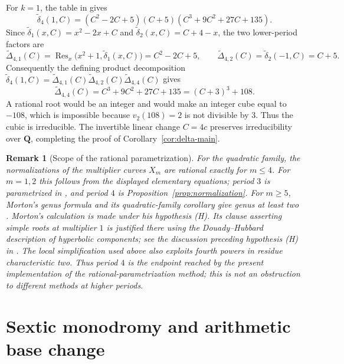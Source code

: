 \documentclass[11pt]{article}
\newtheorem{remark}[theorem]{Remark}
\newcommand{\Q}{\mathbf Q}
\begin{document}
For $k=1$, the table in
\cite[Section 3, Table 1]{MortonVivaldi1995} gives
\[
 \widetilde\delta_4(1,C)
 =(C^2-2C+5)(C+5)(C^3+9C^2+27C+135).
\]
Since
$\widetilde\delta_1(x,C)=x^2-2x+C$ and
$\widetilde\delta_2(x,C)=C+4-x$, the two lower-period factors are
\[
 \widetilde\Delta_{4,1}(C)
 =\operatorname{Res}_x\bigl(x^2+1,\widetilde\delta_1(x,C)\bigr)
 =C^2-2C+5,
 \qquad
 \widetilde\Delta_{4,2}(C)
 =\widetilde\delta_2(-1,C)=C+5.
\]
Consequently the defining product decomposition
$\widetilde\delta_4(1,C)
 =\widetilde\Delta_{4,1}(C)\widetilde\Delta_{4,2}(C)
  \widetilde\Delta_{4,4}(C)$ gives
\[
 \widetilde\Delta_{4,4}(C)
 =C^3+9C^2+27C+135=(C+3)^3+108.
\]
A rational root would be an integer and would make an integer cube
equal to $-108$, which is impossible because $v_2(108)=2$ is not
divisible by $3$.  Thus the cubic is irreducible.  The invertible linear
change $C=4c$ preserves irreducibility over $\Q$, completing the proof
of Corollary~\ref{cor:delta-main}.

\begin{remark}[Scope of the rational parametrization]
\label{rem:rational-scope}
For the quadratic family, the normalizations of the multiplier curves
$X_m$ are rational exactly for $m\le4$.  For $m=1,2$ this follows from
the displayed elementary equations; period $3$ is parametrized in
\cite[Lemma 2.6]{KoizumiMurakamiSanoTakehira2025}, and period $4$ is
Proposition~\ref{prop:normalization}.  For $m\ge5$, Morton's genus
formula and its quadratic-family corollary give genus at least two
\cite[Theorem 13(b),(c) and the corollary following Theorem 14]
{Morton1996}.  Morton's calculation is made under his hypothesis (H).
Its clause asserting simple roots at multiplier $1$ is justified there
using the Douady--Hubbard description of hyperbolic components; see the
discussion preceding hypothesis (H) in \cite{Morton1996}.
The local simplification used above also exploits fourth powers in
residue characteristic two.  Thus period $4$ is the endpoint reached by
the present implementation of the rational-parametrization method; this
is not an obstruction to different methods at higher periods.
\end{remark}

\part{Sextic monodromy and arithmetic base change}




\end{document}
